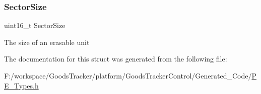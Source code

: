 \subsubsection{\texorpdfstring{Sector\+Size}{SectorSize}}
{\footnotesize\ttfamily uint16\+\_\+t Sector\+Size}

The size of an erasable unit 

The documentation for this struct was generated from the following file\+:\begin{DoxyCompactItemize}
\item 
F\+:/workspace/\+Goods\+Tracker/platform/\+Goods\+Tracker\+Control/\+Generated\+\_\+\+Code/\hyperlink{_p_e___types_8h}{P\+E\+\_\+\+Types.\+h}\end{DoxyCompactItemize}
